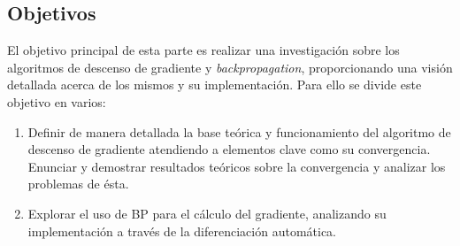 \subsection{Objetivos}

El objetivo principal de esta parte es realizar una investigación sobre los algoritmos de descenso de gradiente y \textit{backpropagation}, proporcionando una visión detallada acerca de los mismos y su implementación. Para ello se divide este objetivo en varios:

\begin{enumerate}

    
    \item Definir de manera detallada la base teórica y funcionamiento del algoritmo de descenso de gradiente atendiendo a elementos clave como su convergencia. Enunciar y demostrar resultados teóricos sobre la convergencia y analizar los problemas de ésta.

    \item Explorar el uso de BP para el cálculo del gradiente, analizando su implementación a través de la diferenciación automática.


\end{enumerate}




